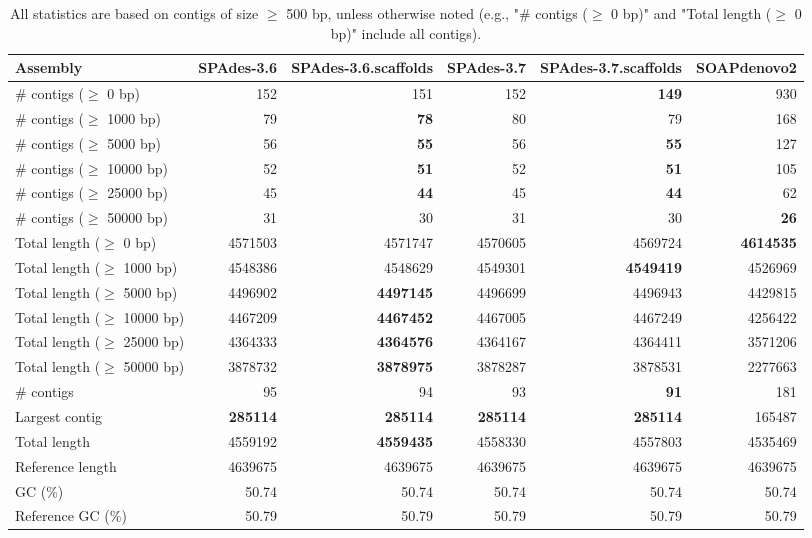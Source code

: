 \documentclass[12pt,a4paper]{article}
\begin{document}
\begin{table}[ht]
\begin{center}
\caption{All statistics are based on contigs of size $\geq$ 500 bp, unless otherwise noted (e.g., "\# contigs ($\geq$ 0 bp)" and "Total length ($\geq$ 0 bp)" include all contigs).}
\begin{tabular}{|l*{5}{|r}|}
\hline
Assembly & SPAdes-3.6 & SPAdes-3.6.scaffolds & SPAdes-3.7 & SPAdes-3.7.scaffolds & SOAPdenovo2 \\ \hline
\# contigs ($\geq$ 0 bp) & 152 & 151 & 152 & {\bf 149} & 930 \\ \hline
\# contigs ($\geq$ 1000 bp) & 79 & {\bf 78} & 80 & 79 & 168 \\ \hline
\# contigs ($\geq$ 5000 bp) & 56 & {\bf 55} & 56 & {\bf 55} & 127 \\ \hline
\# contigs ($\geq$ 10000 bp) & 52 & {\bf 51} & 52 & {\bf 51} & 105 \\ \hline
\# contigs ($\geq$ 25000 bp) & 45 & {\bf 44} & 45 & {\bf 44} & 62 \\ \hline
\# contigs ($\geq$ 50000 bp) & 31 & 30 & 31 & 30 & {\bf 26} \\ \hline
Total length ($\geq$ 0 bp) & 4571503 & 4571747 & 4570605 & 4569724 & {\bf 4614535} \\ \hline
Total length ($\geq$ 1000 bp) & 4548386 & 4548629 & 4549301 & {\bf 4549419} & 4526969 \\ \hline
Total length ($\geq$ 5000 bp) & 4496902 & {\bf 4497145} & 4496699 & 4496943 & 4429815 \\ \hline
Total length ($\geq$ 10000 bp) & 4467209 & {\bf 4467452} & 4467005 & 4467249 & 4256422 \\ \hline
Total length ($\geq$ 25000 bp) & 4364333 & {\bf 4364576} & 4364167 & 4364411 & 3571206 \\ \hline
Total length ($\geq$ 50000 bp) & 3878732 & {\bf 3878975} & 3878287 & 3878531 & 2277663 \\ \hline
\# contigs & 95 & 94 & 93 & {\bf 91} & 181 \\ \hline
Largest contig & {\bf 285114} & {\bf 285114} & {\bf 285114} & {\bf 285114} & 165487 \\ \hline
Total length & 4559192 & {\bf 4559435} & 4558330 & 4557803 & 4535469 \\ \hline
Reference length & 4639675 & 4639675 & 4639675 & 4639675 & 4639675 \\ \hline
GC (\%) & 50.74 & 50.74 & 50.74 & 50.74 & 50.74 \\ \hline
Reference GC (\%) & 50.79 & 50.79 & 50.79 & 50.79 & 50.79 \\ \hline

\end{tabular}
\end{center}
\end{table}
\end{document}

